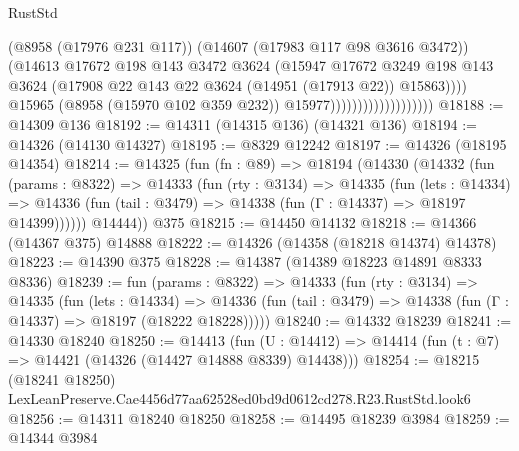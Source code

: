 \begin{lexlean}{RustStd}
\begin{coremodule}
                                            (@8958 (@17976 @231 @117))
                                            (@14607 (@17983 @117 @98 @3616 @3472))
                                            (@14613
                                              @17672
                                              @198
                                              @143
                                              @3472
                                              @3624
                                              (@15947
                                                @17672
                                                @3249
                                                @198
                                                @143
                                                @3624
                                                (@17908
                                                  @22
                                                  @143
                                                  @22
                                                  @3624
                                                  (@14951 (@17913 @22))
                                                  @15863))))
                                          @15965
                                          (@8958 (@15970 @102 @359 @232))
                                          @15977)))))))))))))))))))
@18188 := @14309 @136
@18192 := @14311 (@14315 @136) (@14321 @136)
@18194 := @14326 (@14130 @14327)
@18195 := @8329 @12242
@18197 := @14326 (@18195 @14354)
@18214 := @14325
    (fun (fn : @89) =>
    @18194
      (@14330
        (@14332
          (fun (params : @8322) =>
          @14333
            (fun (rty : @3134) =>
            @14335
              (fun (lets : @14334) =>
              @14336 (fun (tail : @3479) => @14338 (fun (Γ : @14337) => @18197 @14399))))))
        @14444))
    @375
@18215 := @14450 @14132
@18218 := @14366 (@14367 @375) @14888
@18222 := @14326 (@14358 (@18218 @14374) @14378)
@18223 := @14390 @375
@18228 := @14387 (@14389 @18223 @14891 @8333 @8336)
@18239 := fun (params : @8322) =>
  @14333
    (fun (rty : @3134) =>
    @14335
      (fun (lets : @14334) =>
      @14336 (fun (tail : @3479) => @14338 (fun (Γ : @14337) => @18197 (@18222 @18228)))))
@18240 := @14332 @18239
@18241 := @14330 @18240
@18250 := @14413
    (fun (U : @14412) => @14414 (fun (t : @7) => @14421 (@14326 (@14427 @14888 @8339) @14438)))
@18254 := @18215 (@18241 @18250) LexLeanPreserve.Cae4456d77aa62528ed0bd9d0612cd278.R23.RustStd.look6
@18256 := @14311 @18240 @18250
@18258 := @14495 @18239 @3984
@18259 := @14344 @3984

\end{coremodule}
\end{lexlean}
